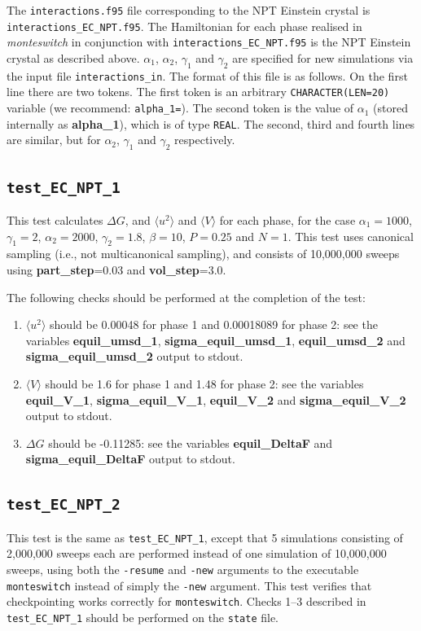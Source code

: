 \documentclass{report}
\begin{document}
The \texttt{interactions.f95} file corresponding to the NPT Einstein crystal is \texttt{interactions\_EC\_NPT.f95}. 
The Hamiltonian for each phase realised in \emph{monteswitch} in conjunction with 
\texttt{interactions\_EC\_NPT.f95} is the NPT Einstein crystal as described above.
$\alpha_1$, $\alpha_2$, $\gamma_1$ and $\gamma_2$ are specified for new simulations via the input file \texttt{interactions\_in}. 
The format of this file is as follows. On the first line there are two tokens. The first token is an arbitrary \texttt{CHARACTER(LEN=20)} 
variable (we recommend: \texttt{alpha\_1=}). The second token is the value of $\alpha_1$ (stored internally as 
\textbf{alpha\_1}), which is of type \texttt{REAL}. The second, third and fourth lines are similar, but for $\alpha_2$, $\gamma_1$ and
$\gamma_2$ respectively.


\subsection{\texttt{test\_EC\_NPT\_1}}
This test calculates $\Delta G$, and $\langle u^2\rangle$ and $\langle V\rangle$ for each phase, for the case $\alpha_1=1000$, $\gamma_1=2$,
$\alpha_2=2000$, $\gamma_2=1.8$, $\beta=10$, $P=0.25$ and $N=1$. This test uses canonical sampling (i.e., not multicanonical sampling), and 
consists of 10,000,000 sweeps using \textbf{part\_step}=0.03 and \textbf{vol\_step}=3.0.

The following checks should be performed at the completion of the test:
\begin{enumerate}
\item
$\langle u^2\rangle$ should be 0.00048 for phase 1 and 0.00018089 for phase 2: see the variables 
\textbf{equil\_umsd\_1}, \textbf{sigma\_equil\_umsd\_1}, \textbf{equil\_umsd\_2} and \textbf{sigma\_equil\_umsd\_2} output to 
stdout.
\item
$\langle V\rangle$ should be 1.6 for phase 1 and 1.48 for phase 2: see the variables \textbf{equil\_V\_1}, 
\textbf{sigma\_equil\_V\_1}, \textbf{equil\_V\_2} and \textbf{sigma\_equil\_V\_2} output to stdout.
\item
$\Delta G$ should be -0.11285: see the variables \textbf{equil\_DeltaF} and \textbf{sigma\_equil\_DeltaF} output to stdout.
\end{enumerate}


\subsection{\texttt{test\_EC\_NPT\_2}}
This test is the same as \texttt{test\_EC\_NPT\_1}, except that 5 simulations consisting of 2,000,000 sweeps each are performed
instead of one simulation of 10,000,000 sweeps, using both the \texttt{-resume} and \texttt{-new} arguments to the executable 
\texttt{monteswitch} instead of simply the \texttt{-new} argument. This test verifies that checkpointing works
correctly for \texttt{monteswitch}. Checks 1--3 described in \texttt{test\_EC\_NPT\_1} should be performed on the \texttt{state} file.
\end{document}
